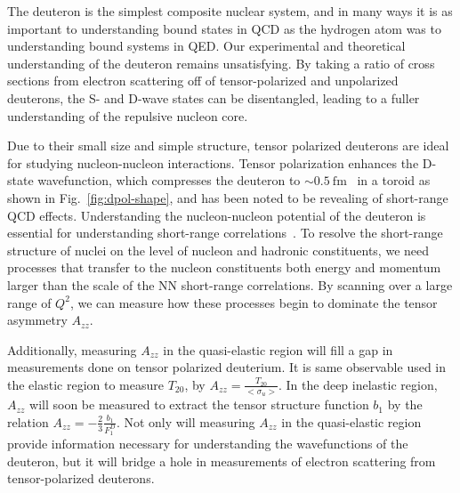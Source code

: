 
The deuteron is the simplest composite nuclear system, and in many ways it is as important to understanding bound states in QCD as the hydrogen atom was to understanding bound systems in QED.  Our experimental and theoretical understanding of the deuteron remains unsatisfying. By taking a ratio of cross sections from electron scattering off of tensor-polarized and unpolarized deuterons, the S- and D-wave states can be disentangled, leading to a fuller understanding of the repulsive nucleon core. 

Due to their small size and simple structure, tensor polarized deuterons are ideal for studying nucleon-nucleon interactions. Tensor polarization enhances the D-state wavefunction, which compresses the deuteron to $\sim0.5\mathrm{~fm}$~\cite{Forest:1996kp} in a toroid as shown in Fig.~\ref{fig:dpol-shape}, and has been noted to be revealing of short-range QCD effects. Understanding the nucleon-nucleon potential of the deuteron is essential for understanding short-range correlations~\cite{Arrington:2011xs}. To resolve the short-range structure of nuclei on the level of nucleon and hadronic constituents, we need processes that transfer to the nucleon constituents both energy and momentum larger than the scale of the NN short-range correlations. By scanning over a large range of $Q^2$, we can measure how these processes begin to dominate the tensor asymmetry $A_{zz}$.

Additionally, measuring $A_{zz}$ in the quasi-elastic region will fill a gap in measurements done on tensor polarized deuterium. It is same observable used in the elastic region to measure $T_{20}$, by $A_{zz}=\frac{T_{20}}{<\sigma_u>}$. In the deep inelastic region, $A_{zz}$ will soon be measured to extract the tensor structure function $b_1$ by the relation $A_{zz}=-\frac{2}{3}\frac{b_1}{F_1^D}$. Not only will measuring $A_{zz}$ in the quasi-elastic region provide information necessary for understanding the wavefunctions of the deuteron, but it will bridge a hole in measurements of electron scattering from tensor-polarized deuterons.



